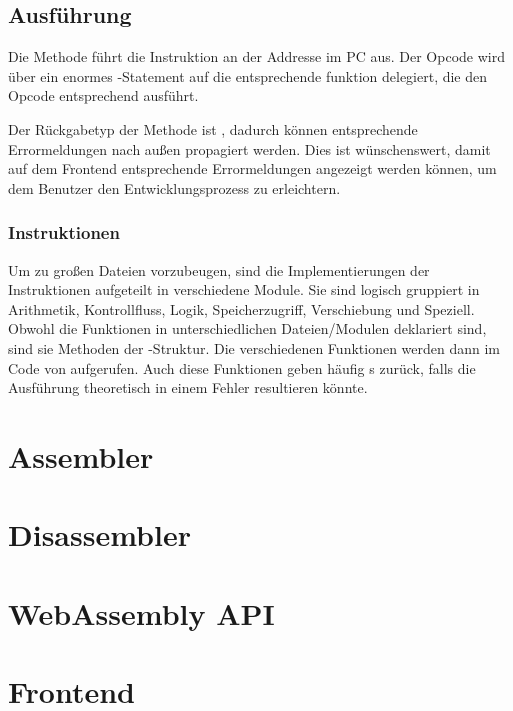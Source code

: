 \subsection{Ausführung}

Die  Methode führt die Instruktion an der Addresse im PC aus. Der Opcode wird über ein enormes -Statement auf die entsprechende funktion delegiert, die den Opcode entsprechend ausführt.

Der Rückgabetyp der Methode ist , dadurch können entsprechende Errormeldungen nach außen propagiert werden. Dies ist wünschenswert, damit auf dem Frontend entsprechende Errormeldungen angezeigt werden können, um dem Benutzer den Entwicklungsprozess zu erleichtern.

\subsubsection{Instruktionen}

Um zu großen Dateien vorzubeugen, sind die Implementierungen der Instruktionen aufgeteilt in verschiedene Module. Sie sind logisch gruppiert in Arithmetik, Kontrollfluss, Logik, Speicherzugriff, Verschiebung und Speziell.
Obwohl die Funktionen in unterschiedlichen Dateien/Modulen deklariert sind, sind sie Methoden der -Struktur.
Die verschiedenen Funktionen werden dann im Code von  aufgerufen.
Auch diese Funktionen geben häufig s zurück, falls die Ausführung theoretisch in einem Fehler resultieren könnte.

\section{Assembler}

\section{Disassembler}

\section{WebAssembly API}

\section{Frontend}
